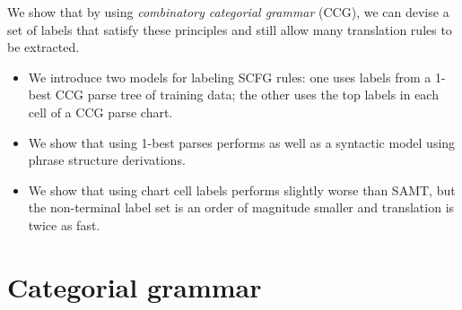 \documentclass{article}
\begin{document}
We show that by using {\em combinatory categorial grammar} (CCG), we can devise a set of labels that satisfy these principles and still allow many translation rules to be extracted.
\begin{itemize}
\item We introduce two models for labeling SCFG rules: one uses labels from a 1-best CCG parse tree of training data; the other uses the top labels in each cell of a CCG parse chart.
\item We show that using 1-best parses performs as well as a syntactic model using phrase structure derivations.
\item We show that using chart cell labels performs slightly worse than SAMT, but the non-terminal label set is an order of magnitude smaller and translation is twice as fast.
\end{itemize}

\section{Categorial grammar}
\label{sec:cg}






\end{document}
